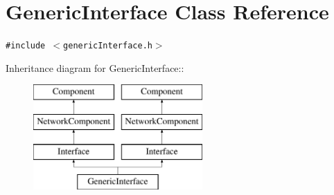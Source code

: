 \hypertarget{classGenericInterface}{
\section{GenericInterface Class Reference}
\label{classGenericInterface}
}
{\tt \#include $<$genericInterface.h$>$}

Inheritance diagram for GenericInterface::\begin{figure}[H]
\begin{center}
\leavevmode
\includegraphics[height=4cm]{classGenericInterface}
\end{center}
\end{figure}
